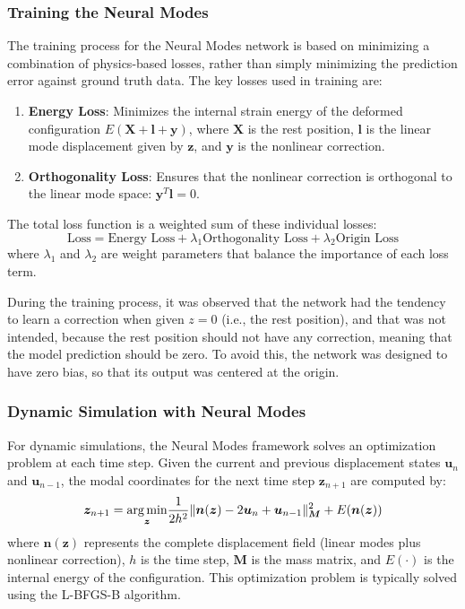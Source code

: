\subsubsection{Training the Neural Modes}
The training process for the Neural Modes network is based on minimizing a combination of physics-based losses, rather than simply minimizing the prediction error against ground truth data. The key losses used in training are:

\begin{enumerate}
    \item \textbf{Energy Loss}: Minimizes the internal strain energy of the deformed configuration $E(\bm{X} + \bm{l} + \bm{y})$, where $\bm{X}$ is the rest position, $\bm{l}$ is the linear mode displacement given by $\bm{z}$, and $\bm{y}$ is the nonlinear correction.
    
    \item \textbf{Orthogonality Loss}: Ensures that the nonlinear correction is orthogonal to the linear mode space: $\bm{y}^T \bm{l} = 0$.
    
\end{enumerate}

The total loss function is a weighted sum of these individual losses:
\begin{equation}
    \text{Loss} = \text{Energy Loss} + \lambda_1 \text{Orthogonality Loss} + \lambda_2 \text{Origin Loss}
\end{equation}
where $\lambda_1$ and $\lambda_2$ are weight parameters that balance the importance of each loss term.

During the training process, it was observed that the network had the tendency to learn a correction when given \(z = 0\) (i.e., the rest position), and that was not intended, because the rest position should not have any correction, meaning that the model prediction should be zero. To avoid this, the network was designed to have zero bias, so that its output was centered at the origin.

\subsubsection{Dynamic Simulation with Neural Modes}
For dynamic simulations, the Neural Modes framework solves an optimization problem at each time step. Given the current and previous displacement states $\bm{u}_n$ and $\bm{u}_{n-1}$, the modal coordinates for the next time step $\bm{z}_{n+1}$ are computed by:
\begin{equation}
    \bm{z}_{n+1} = \underset{\bm{z}}{\operatorname*{arg\,min}} \frac{1}{2h^2} \|\bm{n}(\bm{z}) - 2\bm{u}_n + \bm{u}_{n-1}\|_{\bm{M}}^2 + E(\bm{n}(\bm{z}))
\end{equation}
where $\bm{n}(\bm{z})$ represents the complete displacement field (linear modes plus nonlinear correction), $h$ is the time step, $\bm{M}$ is the mass matrix, and $E(\cdot)$ is the internal energy of the configuration. This optimization problem is typically solved using the L-BFGS-B algorithm.

